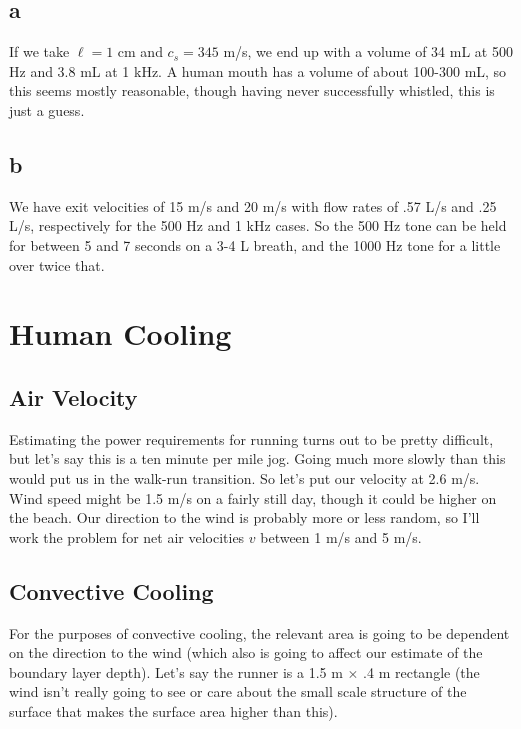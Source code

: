\documentclass[12pt]{article}
\begin{document}
\subsection*{a}

If we take \(\ell = 1\) cm and \(c_s = 345\) m/s, we end up with a volume of 34 mL at 500 Hz and 3.8 mL at 1 kHz. A human mouth has a volume of about 100-300 mL, so this seems mostly reasonable, though having never successfully whistled, this is just a guess.

\subsection*{b}

We have exit velocities of 15 m/s and 20 m/s with flow rates of .57 L/s and .25 L/s, respectively for the 500 Hz and 1 kHz cases. So the 500 Hz tone can be held for between 5 and 7 seconds on a 3-4 L breath, and the 1000 Hz tone for a little over twice that.

\section{Human Cooling}

\subsection{Air Velocity}

Estimating the power requirements for running turns out to be pretty difficult, but let's say this is a ten minute per mile jog. Going much more slowly than this would put us in the walk-run transition. So let's put our velocity at 2.6 m/s. Wind speed might be 1.5 m/s on a fairly still day, though it could be higher on the beach. Our direction to the wind is probably more or less random, so I'll work the problem for net air velocities \(v\) between 1 m/s and 5 m/s.

\subsection{Convective Cooling}

For the purposes of convective cooling, the relevant area is going to be dependent on the direction to the wind (which also is going to affect our estimate of the boundary layer depth). Let's say the runner is a 1.5 m \(\times\) .4 m rectangle (the wind isn't really going to see or care about the small scale structure of the surface that makes the surface area higher than this).
\end{document}
